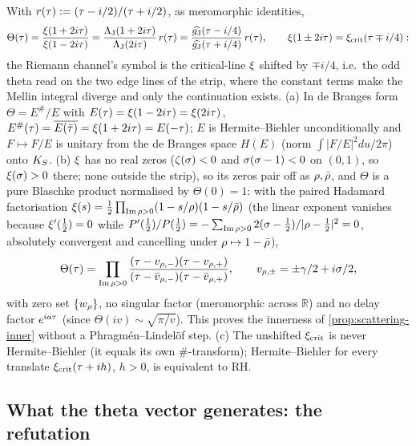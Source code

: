 \begin{theorem}
\label{thm:symbol-edge-quotient}
With $r(\tau) := (\tau-i/2)/(\tau+i/2)$, as meromorphic identities,
\[
\Theta(\tau) = \frac{\xi(1+2i\tau)}{\xi(1-2i\tau)} = \frac{\Lambda_{\mathrm J}(1+2i\tau)}{\Lambda_{\mathrm J}(2i\tau)}\,r(\tau)
= \frac{\widehat{g_{\mathrm J}}(\tau-i/4)}{\widehat{g_{\mathrm J}}(\tau+i/4)}\,r(\tau),\qquad
\xi(1\pm2i\tau) = \xi_{\mathrm{crit}}(\tau\mp i/4):
\]
the Riemann channel's symbol is the critical-line $\xi$ shifted by $\mp i/4$, i.e.\ the odd theta read on the two
edge lines of the strip, where the constant terms make the Mellin integral diverge and only the continuation exists.
(a) In de Branges form $\Theta = E^{\#}/E$ with $E(\tau) = \xi(1-2i\tau) = \xi(2i\tau)$, $E^{\#}(\tau) =
\overline{E(\bar{\tau})} = \xi(1+2i\tau) = E(-\tau)$; $E$ is Hermite--Biehler unconditionally and $F\mapsto F/E$ is
unitary from the de Branges space $H(E)$ (norm $\int|F/E|^2du/2\pi$) onto $K_S$. (b) $\xi$ has no real zeros ($\zeta(\sigma)<0$ and $\sigma(\sigma-1)<0$ on $(0,1)$, so $\xi(\sigma)>0$ there; none outside the strip), so its zeros pair off as $\rho,\bar{\rho}$, and $\Theta$ is a pure Blaschke
product normalised by $\Theta(0) = 1$: with the paired Hadamard factorisation $\xi(s) = \tfrac12\prod_{\operatorname{Im}\rho>0}
(1-s/\rho)(1-s/\bar{\rho})$ (the linear exponent vanishes because $\xi'(\tfrac12) = 0$ while $P'(\tfrac12)/P(\tfrac12) = -\sum_{\operatorname{Im}\rho>0}2(\sigma-\tfrac12)/|\rho-\tfrac12|^2 = 0$, absolutely convergent and cancelling under $\rho\mapsto1-\bar{\rho}$),
\[
\Theta(\tau) = \prod_{\operatorname{Im}\rho>0}\frac{(\tau-v_{\rho,-})(\tau-v_{\rho,+})}{(\tau-\bar v_{\rho,-})(\tau-\bar v_{\rho,+})},
\qquad v_{\rho,\pm} = \pm\gamma/2 + i\sigma/2,
\]
with zero set $\{w_\rho\}$, no singular factor (meromorphic across $\mathbb R$) and no delay factor $e^{ia\tau}$
(since $\Theta(iv)\sim\sqrt{\pi/v}$). This proves the innerness of \cref{prop:scattering-inner} without a
Phragm\'en--Lindel\"of step. (c) The unshifted $\xi_{\mathrm{crit}}$ is never Hermite--Biehler (it equals its own
$\#$-transform); Hermite--Biehler for every translate $\xi_{\mathrm{crit}}(\tau+ih)$, $h>0$, is equivalent to RH.
\end{theorem}

\subsection{What the theta vector generates: the refutation}


